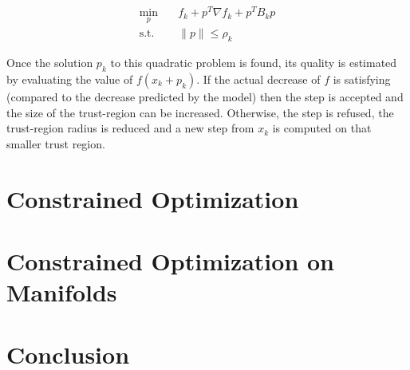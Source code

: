 \begin{align}
  \min_{p} & \quad f_k + p^T\nabla f_k + p^TB_k p \nonumber\\
\text{s.t.}&
\quad \|p\| \leq \rho_k
\label{eq:trustRegion}
\end{align}

Once the solution $p_k$ to this quadratic problem is found, its quality is
estimated by evaluating the value of $f(x_k+p_k)$. If the actual decrease of $f$
is satisfying (compared to the decrease predicted by the model) then the step is
accepted and the size of the trust-region can be increased. Otherwise, the step
is refused, the trust-region radius is reduced and a new step from $x_k$ is
computed on that smaller trust region.

\section{Constrained Optimization}

\section{Constrained Optimization on Manifolds}

\section{Conclusion}

